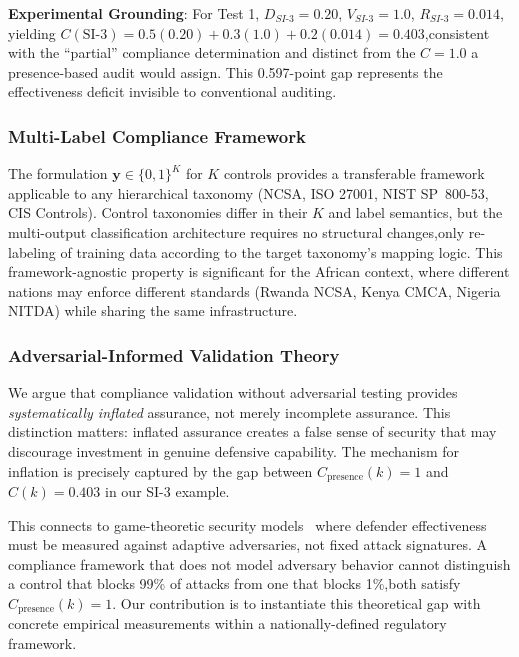 \documentclass[futureinternet,article,submit,pdftex,moreauthors]{Definitions/mdpi}
\begin{document}
\textbf{Experimental Grounding}: For Test 1, $D_{SI\text{-}3} = 0.20$, $V_{SI\text{-}3} = 1.0$,
$R_{SI\text{-}3} = 0.014$, yielding
$C(\text{SI-3}) = 0.5(0.20) + 0.3(1.0) + 0.2(0.014) = 0.403$,consistent with the
``partial'' compliance determination and distinct from the $C = 1.0$ a presence-based audit
would assign. This 0.597-point gap represents the effectiveness deficit invisible to
conventional auditing.

\subsubsection{Multi-Label Compliance Framework}

The formulation $\mathbf{y} \in \{0,1\}^K$ for $K$ controls provides a transferable
framework applicable to any hierarchical taxonomy (NCSA, ISO 27001, NIST SP~800-53, CIS
Controls). Control taxonomies differ in their $K$ and label semantics, but the multi-output
classification architecture requires no structural changes,only re-labeling of training data
according to the target taxonomy's mapping logic. This framework-agnostic property is
significant for the African context, where different nations may enforce different standards
(Rwanda NCSA, Kenya CMCA, Nigeria NITDA) while sharing the same infrastructure.

\subsubsection{Adversarial-Informed Validation Theory}

We argue that compliance validation without adversarial testing provides \textit{systematically
inflated} assurance, not merely incomplete assurance. This distinction matters: inflated
assurance creates a false sense of security that may discourage investment in genuine
defensive capability. The mechanism for inflation is precisely captured by the gap between
$C_{\text{presence}}(k) = 1$ and $C(k) = 0.403$ in our SI-3 example.

This connects to game-theoretic security models~\cite{mitre_attack_applications} where
defender effectiveness must be measured against adaptive adversaries, not fixed attack
signatures. A compliance framework that does not model adversary behavior cannot distinguish
a control that blocks 99\% of attacks from one that blocks 1\%,both satisfy
$C_{\text{presence}}(k) = 1$. Our contribution is to instantiate this theoretical gap with
concrete empirical measurements within a nationally-defined regulatory framework.
\end{document}
